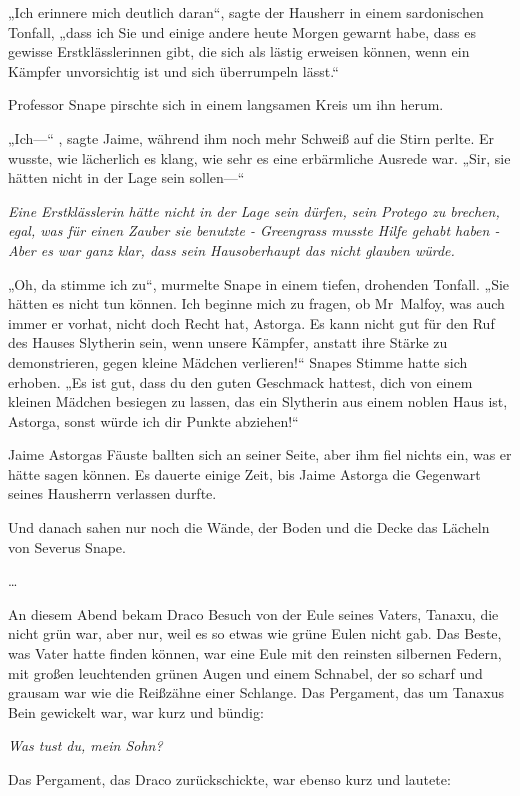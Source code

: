 {„Ich erinnere mich deutlich daran“, sagte der Hausherr in einem sardonischen Tonfall, „dass ich Sie und einige andere heute Morgen gewarnt habe, dass es gewisse Erstklässlerinnen gibt, die sich als lästig erweisen können, wenn ein Kämpfer unvorsichtig ist und sich überrumpeln lässt.“

Professor Snape pirschte sich in einem langsamen Kreis um ihn herum.

„Ich—“ , sagte Jaime, während ihm noch mehr Schweiß auf die Stirn perlte. Er wusste, wie lächerlich es klang, wie sehr es eine erbärmliche Ausrede war. „Sir, sie hätten nicht in der Lage sein sollen—“

\emph{Eine Erstklässlerin hätte nicht in der Lage sein dürfen, sein Protego zu brechen, egal, was für einen Zauber sie benutzte - Greengrass musste Hilfe gehabt haben - Aber es war ganz klar, dass sein Hausoberhaupt das nicht glauben würde.}

„Oh, da stimme ich zu“, murmelte Snape in einem tiefen, drohenden Tonfall. „Sie hätten es nicht tun können. Ich beginne mich zu fragen, ob Mr~Malfoy, was auch immer er vorhat, nicht doch Recht hat, Astorga. Es kann nicht gut für den Ruf des Hauses Slytherin sein, wenn unsere Kämpfer, anstatt ihre Stärke zu demonstrieren, gegen kleine Mädchen verlieren!“ Snapes Stimme hatte sich erhoben. „Es ist gut, dass du den guten Geschmack hattest, dich von einem kleinen Mädchen besiegen zu lassen, das ein Slytherin aus einem noblen Haus ist, Astorga, sonst würde ich dir Punkte abziehen!“

Jaime Astorgas Fäuste ballten sich an seiner Seite, aber ihm fiel nichts ein, was er hätte sagen können. Es dauerte einige Zeit, bis Jaime Astorga die Gegenwart seines Hausherrn verlassen durfte.

Und danach sahen nur noch die Wände, der Boden und die Decke das Lächeln von Severus Snape.

…

An diesem Abend bekam Draco Besuch von der Eule seines Vaters, Tanaxu, die nicht grün war, aber nur, weil es so etwas wie grüne Eulen nicht gab. Das Beste, was Vater hatte finden können, war eine Eule mit den reinsten silbernen Federn, mit großen leuchtenden grünen Augen und einem Schnabel, der so scharf und grausam war wie die Reißzähne einer Schlange. Das Pergament, das um Tanaxus Bein gewickelt war, war kurz und bündig:

\emph{Was tust du, mein Sohn?}

Das Pergament, das Draco zurückschickte, war ebenso kurz und lautete:

}
